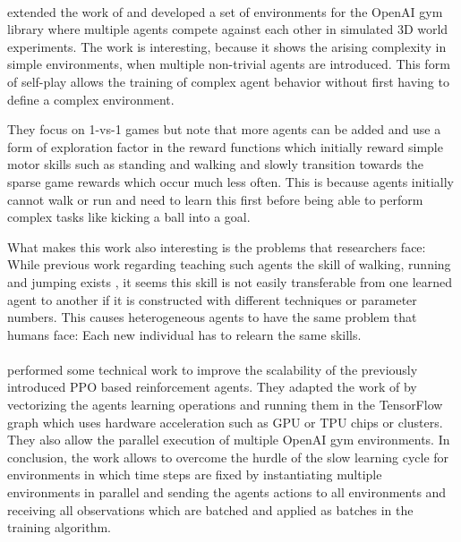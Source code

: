 \documentclass[12pt,a4paper]{article}
\begin{document}
\paragraph{\citeauthor{bansal2017emergent}} extended the work of \cite{proximalpolicyopt} and developed a set of
environments for the OpenAI gym library where multiple agents compete against each other in simulated 3D world
experiments. The work is interesting, because it shows the arising complexity in simple environments, when multiple
non-trivial agents are introduced. This form of self-play allows the training of complex agent behavior without first
having to define a complex environment.

They focus on 1-vs-1 games but note that more agents can be added and use a form of exploration factor in the reward
functions which initially reward simple motor skills such as standing and walking and slowly transition towards the
sparse game rewards which occur much less often. This is because agents initially cannot walk or run and need to learn
this first before being able to perform complex tasks like kicking a ball into a goal.

What makes this work also interesting is the problems that researchers face: While previous work regarding teaching such
agents the skill of walking, running and jumping exists \cite{heess2017emergence,proximalpolicyopt}, it seems this skill
is not easily transferable from one learned agent to another if it is constructed with different techniques or parameter
numbers. This causes heterogeneous agents to have the same problem that humans face: Each new individual has to relearn
the same skills.

\paragraph{\citeauthor{hafner2017agents}} performed some technical work to improve the scalability of the previously
introduced \ac{PPO} based reinforcement agents. They adapted the work of \citeauthor{proximalpolicyopt} by vectorizing
the agents learning operations and running them in the TensorFlow graph which uses hardware acceleration such as
\ac{GPU} or \ac{TPU} chips or clusters. They also allow the parallel execution of multiple OpenAI gym environments. In
conclusion, the work allows to overcome the hurdle of the slow learning cycle for environments in which time steps are
fixed by instantiating multiple environments in parallel and sending the agents actions to all environments and
receiving all observations which are batched and applied as batches in the training algorithm.


\newpage
 


\end{document}
